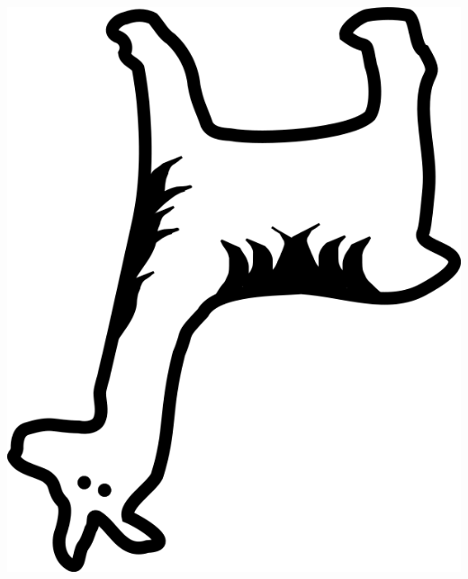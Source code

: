 \documentclass[noauthor,nooutcomes,12pt,hints,handout]{ximera}
\begin{document}
\begin{question}
\begin{freeResponse}
\begin{center}
      \includegraphics{rLlama.png}
    \end{center}
  \end{freeResponse}
\end{question}
\mynewpage
\end{document}
